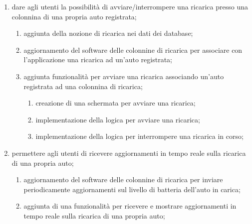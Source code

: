 \documentclass[a4paper,12pt]{article}
\begin{document}
\begin{enumerate}
\begin{enumerate}
\begin{enumerate}
            \item gestione della posizione dell'utente;
        \end{enumerate}
        \item aggiornamento del software delle colonnine di ricarica per inviare aggiornamenti in tempo reale sulla
        loro disponibilità;
        \begin{enumerate}
            \item implementazione all'interno del software delle colonnine di ricarica della gestione della disponibilità
            delle colonnine di ricarica;
            \item implementazione all'interno del software delle colonnine di ricarica dell'invio della disponibilità
            delle colonnine di ricarica;
        \end{enumerate}
    \end{enumerate}
    \item dare agli utenti la possibilità di avviare/interrompere una ricarica presso una colonnina di una propria auto
    registrata;
    \begin{enumerate}
        \item aggiunta della nozione di ricarica nei dati dei database;
        \item aggiornamento del software delle colonnine di ricarica per associare con l'applicazione una ricarica ad
        un'auto registrata;
        \item aggiunta funzionalità per avviare una ricarica associando un'auto registrata ad una colonnina di ricarica;
        \begin{enumerate}
            \item creazione di una schermata per avviare una ricarica;
            \item implementazione della logica per avviare una ricarica;
            \item implementazione della logica per interrompere una ricarica in corso;
        \end{enumerate}
    \end{enumerate}
    \item permettere agli utenti di ricevere aggiornamenti in tempo reale sulla ricarica di una propria auto;
    \begin{enumerate}
        \item aggiornamento del software delle colonnine di ricarica per inviare periodicamente aggiornamenti sul
        livello di batteria dell'auto in carica;
        \item aggiunta di una funzionalità per ricevere e mostrare aggiornamenti in tempo reale sulla ricarica di una propria auto;

\end{enumerate}
\end{enumerate}
\end{document}
